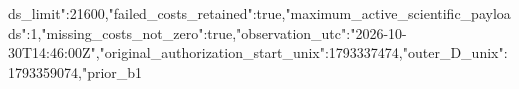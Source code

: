 \documentclass[10pt]{article}
\begin{document}
\allowbreak{}d\allowbreak{}s\allowbreak{}\_\allowbreak{}l\allowbreak{}i\allowbreak{}m\allowbreak{}i\allowbreak{}t\allowbreak{}"\allowbreak{}:\allowbreak{}2\allowbreak{}1\allowbreak{}6\allowbreak{}0\allowbreak{}0\allowbreak{},\allowbreak{}"\allowbreak{}f\allowbreak{}a\allowbreak{}i\allowbreak{}l\allowbreak{}e\allowbreak{}d\allowbreak{}\_\allowbreak{}c\allowbreak{}o\allowbreak{}s\allowbreak{}t\allowbreak{}s\allowbreak{}\_\allowbreak{}r\allowbreak{}e\allowbreak{}t\allowbreak{}a\allowbreak{}i\allowbreak{}n\allowbreak{}e\allowbreak{}d\allowbreak{}"\allowbreak{}:\allowbreak{}t\allowbreak{}r\allowbreak{}u\allowbreak{}e\allowbreak{},\allowbreak{}"\allowbreak{}m\allowbreak{}a\allowbreak{}x\allowbreak{}i\allowbreak{}m\allowbreak{}u\allowbreak{}m\allowbreak{}\_\allowbreak{}a\allowbreak{}c\allowbreak{}t\allowbreak{}i\allowbreak{}v\allowbreak{}e\allowbreak{}\_\allowbreak{}s\allowbreak{}c\allowbreak{}i\allowbreak{}e\allowbreak{}n\allowbreak{}t\allowbreak{}i\allowbreak{}f\allowbreak{}i\allowbreak{}c\allowbreak{}\_\allowbreak{}p\allowbreak{}a\allowbreak{}y\allowbreak{}l\allowbreak{}o\allowbreak{}a\allowbreak{}d\allowbreak{}s\allowbreak{}"\allowbreak{}:\allowbreak{}1\allowbreak{},\allowbreak{}"\allowbreak{}m\allowbreak{}i\allowbreak{}s\allowbreak{}s\allowbreak{}i\allowbreak{}n\allowbreak{}g\allowbreak{}\_\allowbreak{}c\allowbreak{}o\allowbreak{}s\allowbreak{}t\allowbreak{}s\allowbreak{}\_\allowbreak{}n\allowbreak{}o\allowbreak{}t\allowbreak{}\_\allowbreak{}z\allowbreak{}e\allowbreak{}r\allowbreak{}o\allowbreak{}"\allowbreak{}:\allowbreak{}t\allowbreak{}r\allowbreak{}u\allowbreak{}e\allowbreak{},\allowbreak{}"\allowbreak{}o\allowbreak{}b\allowbreak{}s\allowbreak{}e\allowbreak{}r\allowbreak{}v\allowbreak{}a\allowbreak{}t\allowbreak{}i\allowbreak{}o\allowbreak{}n\allowbreak{}\_\allowbreak{}u\allowbreak{}t\allowbreak{}c\allowbreak{}"\allowbreak{}:\allowbreak{}"\allowbreak{}2\allowbreak{}0\allowbreak{}2\allowbreak{}6\allowbreak{}-\allowbreak{}1\allowbreak{}0\allowbreak{}-\allowbreak{}3\allowbreak{}0\allowbreak{}T\allowbreak{}1\allowbreak{}4\allowbreak{}:\allowbreak{}4\allowbreak{}6\allowbreak{}:\allowbreak{}0\allowbreak{}0\allowbreak{}Z\allowbreak{}"\allowbreak{},\allowbreak{}"\allowbreak{}o\allowbreak{}r\allowbreak{}i\allowbreak{}g\allowbreak{}i\allowbreak{}n\allowbreak{}a\allowbreak{}l\allowbreak{}\_\allowbreak{}a\allowbreak{}u\allowbreak{}t\allowbreak{}h\allowbreak{}o\allowbreak{}r\allowbreak{}i\allowbreak{}z\allowbreak{}a\allowbreak{}t\allowbreak{}i\allowbreak{}o\allowbreak{}n\allowbreak{}\_\allowbreak{}s\allowbreak{}t\allowbreak{}a\allowbreak{}r\allowbreak{}t\allowbreak{}\_\allowbreak{}u\allowbreak{}n\allowbreak{}i\allowbreak{}x\allowbreak{}"\allowbreak{}:\allowbreak{}1\allowbreak{}7\allowbreak{}9\allowbreak{}3\allowbreak{}3\allowbreak{}3\allowbreak{}7\allowbreak{}4\allowbreak{}7\allowbreak{}4\allowbreak{},\allowbreak{}"\allowbreak{}o\allowbreak{}u\allowbreak{}t\allowbreak{}e\allowbreak{}r\allowbreak{}\_\allowbreak{}D\allowbreak{}\_\allowbreak{}u\allowbreak{}n\allowbreak{}i\allowbreak{}x\allowbreak{}"\allowbreak{}:\allowbreak{}1\allowbreak{}7\allowbreak{}9\allowbreak{}3\allowbreak{}3\allowbreak{}5\allowbreak{}9\allowbreak{}0\allowbreak{}7\allowbreak{}4\allowbreak{},\allowbreak{}"\allowbreak{}p\allowbreak{}r\allowbreak{}i\allowbreak{}o\allowbreak{}r\allowbreak{}\_\allowbreak{}b\allowbreak{}1\a
\end{document}
